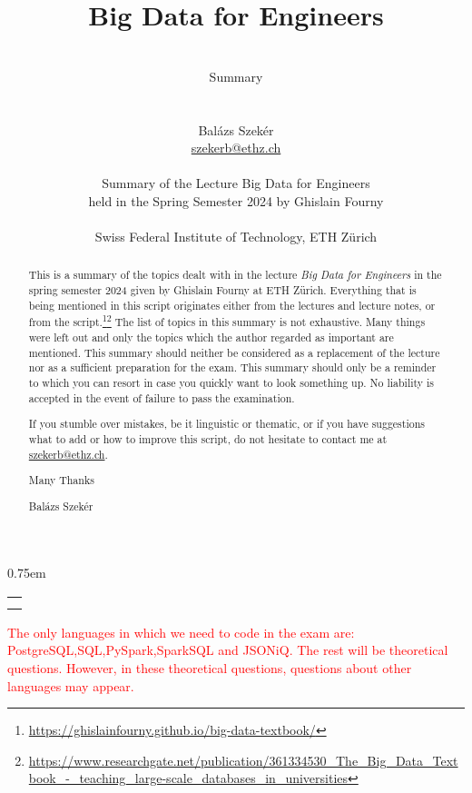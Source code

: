 \documentclass[a4paper]{article}
\title{Big Data for Engineers}
\author{\\ Summary \\ \\ \\ Balázs Szekér \\ \href{mailto:szekerb@ethz.ch}{szekerb@ethz.ch} \\ \\ Summary of the Lecture Big Data for Engineers \\ held in the Spring Semester 2024 by
Ghislain Fourny \\ \\ Swiss Federal Institute of Technology, ETH Zürich \\}
\makeatletter
\renewcommand{\maketitle}{%
  \begin{titlepage}
    \begin{center}
      \vspace*{5cm} %
      {\Huge\@title\par} %
      \vspace{0cm} %
      {\large
        \lineskip 0.75em %
        \begin{tabular}[t]{c}
          \@author \\
          \@date
        \end{tabular}\par}
      \vspace{1cm} %
    \end{center}
  \end{titlepage}
}
\makeatother
\begin{document}
\begin{titlepage}
    \maketitle
    \thispagestyle{empty}
\end{titlepage}
\pagebreak
{} 
\thispagestyle{myplain}
\begin{abstract}
    This is a summary of the topics dealt with in the lecture \textit{Big Data for Engineers} in the spring semester 2024 given by Ghislain Fourny at ETH Zürich. Everything that is being mentioned in this script originates either from the lectures and lecture notes, or from the script.\footnote[1]{\url{https://ghislainfourny.github.io/big-data-textbook/}}\footnote[2]{\url{https://www.researchgate.net/publication/361334530_The_Big_Data_Textbook_-_teaching_large-scale_databases_in_universities}} The list of topics in this summary is not exhaustive. Many things were left out and only the topics which the author regarded as important are mentioned. This summary should neither be considered as a replacement of the lecture nor as a sufficient preparation for the exam. This summary should only be a reminder to which you can resort in case you quickly want to look something up. No liability is accepted in the event of failure to pass the examination.

    \vspace{1\baselineskip}

    If you stumble over mistakes, be it linguistic or thematic, or if you have suggestions what to add or how to improve this script, do not hesitate to contact me at
    \href{mailto:szekerb@ethz.ch}{szekerb@ethz.ch}.

    \vspace{1\baselineskip}

    Many Thanks
    
    \vspace{1\baselineskip}

    Balázs Szekér
\end{abstract}
\newpage
\thispagestyle{myplain}
\tableofcontents
\pagebreak
{}

\textcolor{red}{The only languages in which we need to code in the exam are: PostgreSQL,SQL,PySpark,SparkSQL and JSONiQ. The rest will be theoretical questions. However, in these theoretical questions, questions about other languages may appear.}


\end{document}
